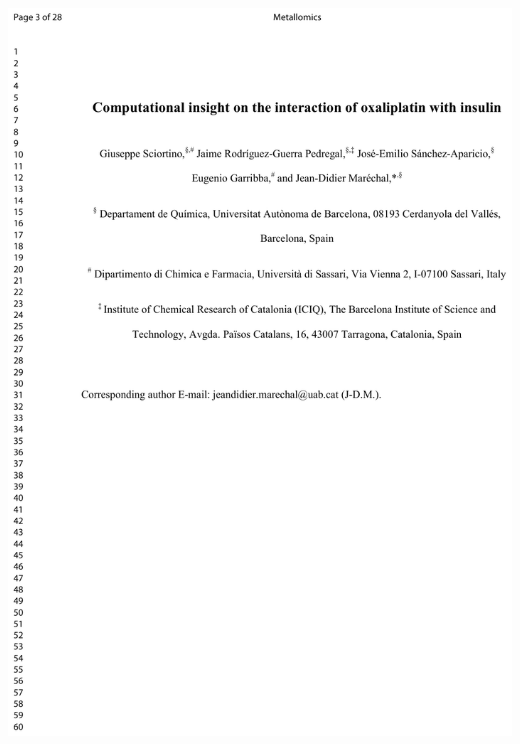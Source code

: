 \includegraphics[width=\textwidth]{figures/pubs/metallomics.pdf}
\clearpage\thispagestyle{empty}\mbox{}\clearpage
